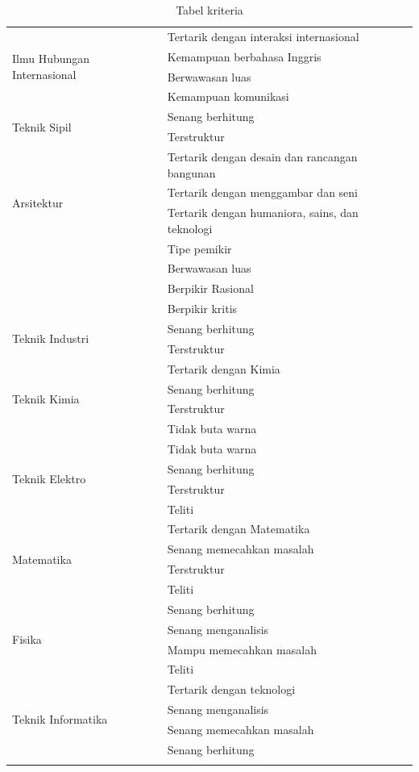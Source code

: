 \begin{longtable}[H]{| p{6cm} | p{8cm} |}
		\hline
		\multirow{4}{10em}{Ilmu Hubungan Internasional} & Tertarik dengan interaksi internasional \\
		& Kemampuan berbahasa Inggris \\
		& Berwawasan luas \\
		& Kemampuan komunikasi\\
		
		\hline
		\multirow{2}{10em}{Teknik Sipil} & Senang berhitung \\
		& Terstruktur \\
		
		\hline
		\multirow{4}{10em}{Arsitektur} & Tertarik dengan desain dan rancangan bangunan \\
		& Tertarik dengan menggambar dan seni\\
		& Tertarik dengan humaniora, sains, dan teknologi \\
		
		\hline
		\multirow{4}{10em}{Ilmu Filsafat} & Tipe pemikir \\
		& Berwawasan luas \\
		& Berpikir Rasional \\
		& Berpikir kritis \\
		
		\hline
		\multirow{2}{10em}{Teknik Industri} &  Senang berhitung \\
		& Terstruktur \\
		
		\hline
		\multirow{4}{10em}{Teknik Kimia} & Tertarik dengan Kimia \\
		& Senang berhitung \\
		& Terstruktur \\
		& Tidak buta warna\\
		
		\hline
		\multirow{4}{10em}{Teknik Elektro} & Tidak buta warna \\
		& Senang berhitung \\
		& Terstruktur \\
		& Teliti \\

		\hline
		\multirow{4}{10em}{Matematika} & Tertarik dengan Matematika \\
		& Senang memecahkan masalah \\
		& Terstruktur \\
		& Teliti \\
		
		\hline
		\multirow{4}{10em}{Fisika} & Senang berhitung \\
		& Senang menganalisis \\
		& Mampu memecahkan masalah\\
		& Teliti \\
		
		\hline
		\multirow{4}{10em}{Teknik Informatika} & Tertarik dengan teknologi \\
		& Senang menganalisis \\
		& Senang memecahkan masalah \\
		& Senang berhitung \\
		
		\hline
	\caption{Tabel kriteria}
	\label{tab:tabel kriteri}
\end{longtable}